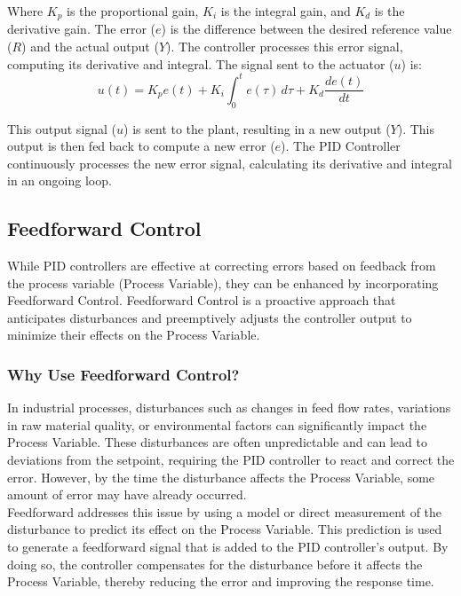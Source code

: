 Where $K_p$ is the proportional gain, $K_i$ is the integral gain, and $K_d$ is
the derivative gain. The error ($e$) is the difference between the desired
reference value ($R$) and the actual output ($Y$). The controller processes
this error signal, computing its derivative and integral. The signal sent to
the actuator ($u$) is:
\begin{equation*}
    u(t) = K_p e(t) + K_i \int_{0}^{t} e(\tau) \, d\tau + K_d \frac{de(t)}{dt}
\end{equation*}

This output signal ($u$) is sent to the plant, resulting in a new output ($Y$).
This output is then fed back to compute a new error ($e$). The PID Controller
continuously processes the new error signal, calculating its derivative and
integral in an ongoing loop.

\subsection{Feedforward Control}

While PID controllers are effective at correcting errors based on feedback from
the process variable (Process Variable), they can be enhanced by incorporating
Feedforward Control. Feedforward Control is a proactive approach that
anticipates disturbances and preemptively adjusts the controller output to
minimize their effects on the Process Variable.

\subsubsection{Why Use Feedforward Control?}

In industrial processes, disturbances such as changes in feed flow rates,
variations in raw material quality, or environmental factors can significantly
impact the Process Variable. These disturbances are often unpredictable and can
lead to deviations from the setpoint, requiring the PID controller to react and
correct the error. However, by the time the disturbance affects the Process
Variable, some amount of error may have already occurred.\\

Feedforward addresses this issue by using a
model or direct measurement of the disturbance to predict its effect on the
Process Variable. This prediction is used to generate a feedforward signal that
is added to the PID controller's output. By doing so, the controller
compensates for the disturbance before it affects the Process Variable, thereby
reducing the error and improving the response time.

